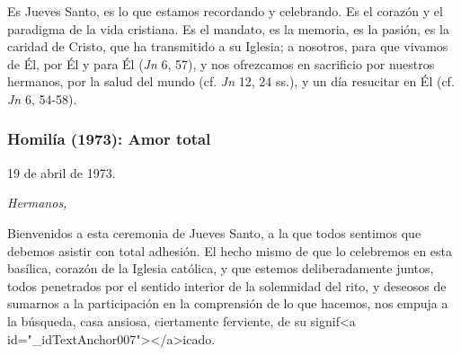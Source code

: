 			\begin{body}Es Jueves Santo, es lo que estamos recordando y celebrando. Es el corazón y el paradigma de la vida cristiana. Es el mandato, es la memoria, es la pasión, es la caridad de Cristo, que ha transmitido a su Iglesia; a nosotros, para que vivamos de Él, por Él y para Él (\textit{Jn }6, 57), y nos ofrezcamos en sacrificio por nuestros hermanos, por la salud del mundo (cf. \textit{Jn }12, 24 ss.), y un día resucitar en Él (cf. \textit{Jn }6, 54-58).\end{body}
			
			\subsubsection{Homilía (1973): Amor total}
			
			\begin{referencia}19 de abril de 1973.\end{referencia}
			
			\begin{body} \textit{Hermanos, }\end{body}
			
			\begin{body}Bienvenidos a esta ceremonia de Jueves Santo, a la que todos sentimos que debemos asistir con total adhesión. El hecho mismo de que lo celebremos en esta basílica, corazón de la Iglesia católica, y que estemos deliberadamente juntos, todos penetrados por el sentido interior de la solemnidad del rito, y deseosos de sumarnos a la participación en la comprensión de lo que hacemos, nos empuja a la búsqueda, casa ansiosa, ciertamente ferviente, de su signif<a id="_idTextAnchor007"></a>icado. \end{body}
			

